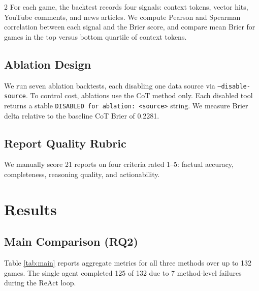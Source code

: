 \documentclass[11pt]{article}
\begin{document}
\begin{multicols}{2}
For each game, the backtest records four signals: context tokens, vector hits, YouTube comments, and news articles. We compute Pearson and Spearman correlation between each signal and the Brier score, and compare mean Brier for games in the top versus bottom quartile of context tokens.

\subsection{Ablation Design}

We run seven ablation backtests, each disabling one data source via \texttt{--disable-source}. To control cost, ablations use the CoT method only. Each disabled tool returns a stable \texttt{DISABLED for ablation: <source>} string. We measure Brier delta relative to the baseline CoT Brier of 0.2281.

\subsection{Report Quality Rubric}

We manually score 21 reports on four criteria rated 1--5: factual accuracy, completeness, reasoning quality, and actionability.

\section{Results}

\subsection{Main Comparison (RQ2)}

Table \ref{tab:main} reports aggregate metrics for all three methods over up to 132 games. The single agent completed 125 of 132 due to 7 method-level failures during the ReAct loop.

\begin{table}[H]
\centering
\caption{Main evaluation results. Lower Brier, log loss, and ECE are better. Higher accuracy is better.}
\label{tab:main}
\end{table}


\end{multicols}
\end{document}
